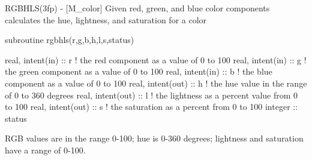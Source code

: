\begin{DoxyDescription}
\item[\label{_RGBHLS}%
N\+A\+ME ]R\+G\+B\+H\+L\+S(3fp) -\/ \mbox{[}M\+\_\+color\mbox{]} Given red, green, and blue color components calculates the hue, lightness, and saturation for a color 


\item[S\+Y\+N\+O\+P\+S\+IS ]
\begin{DoxyPre}
    subroutine rgbhls(r,g,b,h,l,s,status)\end{DoxyPre}



\begin{DoxyPre}     real, intent(in)  :: r ! the red component as a value of 0 to 100
     real, intent(in)  :: g ! the green component as a value of 0 to 100
     real, intent(in)  :: b ! the blue component as a value of 0 to 100
     real, intent(out) :: h ! the hue value in the range of 0 to 360 degrees
     real, intent(out) :: l ! the lightness as a percent value from 0 to 100
     real, intent(out) :: s ! the saturation as a percent from 0 to 100
     integer           :: status
    \end{DoxyPre}
 


\item[D\+E\+S\+C\+R\+I\+P\+T\+I\+ON ]

R\+GB values are in the range 0-\/100; hue is 0-\/360 degrees; lightness and saturation have a range of 0-\/100. ~\newline
~\newline



\end{DoxyDescription}
